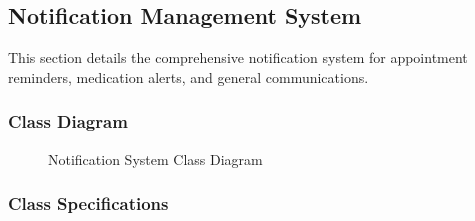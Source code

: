 \documentclass[12pt,a4paper]{article}
\begin{document}
\subsection{Notification Management System}

This section details the comprehensive notification system for appointment reminders, medication alerts, and general communications.

\subsubsection{Class Diagram}

\begin{figure}[H]
\centering
{}
\caption{Notification System Class Diagram}
\label{fig:notification-class-diagram}
\end{figure}

\subsubsection{Class Specifications}
\end{document}
